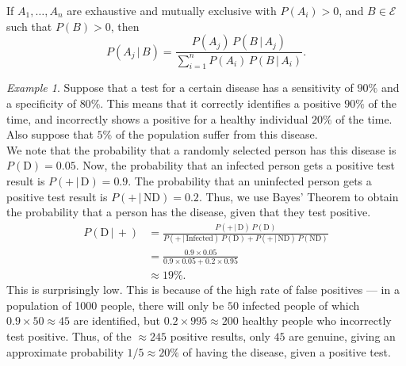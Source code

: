 \documentclass[11pt]{article}
\theoremstyle{definition}
\theoremstyle{remark}
\newtheorem*{example}{Example}
\numberwithin{equation}{module}
\begin{document}
    \begin{corollary}
        If $A_1, \dots, A_n$ are exhaustive and mutually exclusive with $P(A_i) >
        0$, and $B \in \mathcal{E}$ such that $P(B) > 0$, then \[
            P(A_j \,|\, B) = \frac{P(A_j) \,P(B\,|\, A_j)}{\sum_{i = 1}^n P(A_i)\,
            P(B \,|\, A_i)}.
        \] 
    \end{corollary}
    \begin{example}
        Suppose that a test for a certain disease has a sensitivity of $90\%$ and a
        specificity of $80\%$. This means that it correctly identifies a positive
        $90\%$ of the time, and incorrectly shows a positive for a healthy
        individual $20\%$ of the time. Also suppose that $5\%$ of the population
        suffer from this disease. \\

        We note that the probability that a randomly selected person has this
        disease is $P(\text{D}) = 0.05$. Now, the probability that an
        infected person gets a positive test result is $P(+ \,|\, \text{D}) =
        0.9$. The probability that an uninfected person gets a positive test result
        is $P(+ \,|\, \text{ND}) = 0.2$. Thus, we use Bayes' Theorem to
        obtain the probability that a person has the disease, given that they test
        positive. 
        \begin{align*}
            P(\text{D} \,|\, +) &= \frac{P(+ \,|\, \text{D}) \,
                P(\text{D})}{P(+ \,|\, \text{Infected}) \, P(\text{D}) +
                P(+ \,|\, \text{ND}) \, P(\text{ND})} \\
                &= \frac{0.9\times 0.05}{0.9\times 0.05 + 0.2\times 0.95} \\ 
                &\approx 19\%.
        \end{align*}
        This is surprisingly low. This is because of the high rate of false
        positives --- in a population of 1000 people, there will only be $50$
        infected people of which $0.9 \times 50 \approx 45$ are identified, but $0.2
        \times 995 \approx 200$ healthy people who incorrectly test positive. Thus,
        of the $\approx 245$ positive results, only $45$ are genuine, giving an
        approximate probability $1 /5 \approx 20\%$ of having the disease, given a
        positive test. 


\end{example}
\end{document}
